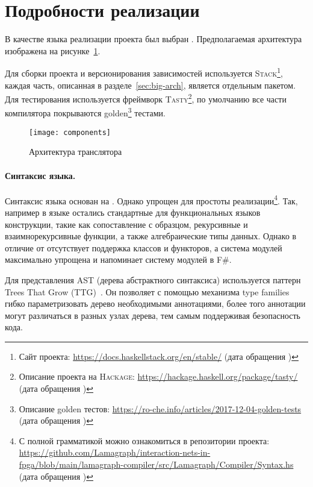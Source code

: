 
\section{Подробности реализации}

В качестве языка реализации проекта был выбран \Haskell{}.
Предполагаемая архитектура изображена на рисунке~\ref{fig:lmlcmods}.

Для сборки проекта и версионирования зависимостей используется \textsc{Stack}\footnote{Сайт проекта: \url{https://docs.haskellstack.org/en/stable/} (дата обращения )}, каждая часть, описанная в разделе~\ref{sec:big-arch}, является отдельным пакетом.
Для тестирования используется фреймворк \textsc{Tasty}\footnote{Описание проекта на \textsc{Hackage}: \url{https://hackage.haskell.org/package/tasty/} (дата обращения )}, по умолчанию все части компилятора покрываются golden\footnote{Описание golden тестов: \url{https://ro-che.info/articles/2017-12-04-golden-tests} (дата обращения )} тестами.

\begin{figure}[h]
    \begin{center}
        \texttt{[image: components]}
    \end{center}
    \caption{Архитектура транслятора}
    \label{fig:lmlcmods}
\end{figure}

\paragraph{Синтаксис языка.}

Синтаксис языка основан на \OCaml{}.
Однако упрощен для простоты реализации\footnote{С полной грамматикой можно ознакомиться в репозитории проекта: \url{https://github.com/Lamagraph/interaction-nets-in-fpga/blob/main/lamagraph-compiler/src/Lamagraph/Compiler/Syntax.hs} (дата обращения )}.
Так, например в языке остались стандартные для функциональных языков конструкции, такие как сопоставление с образцом, рекурсивные и взаимнорекурсивные функции, а также алгебраические типы данных.
Однако в отличие от \OCaml{} отсутствует поддержка классов и функторов, а система модулей максимально упрощена и напоминает систему модулей в F\#.

Для представления AST (дерева абстрактного синтаксиса) используется паттерн Trees That Grow (TTG)~\cite{shayannajdTreesThatGrow}.
Он позволяет с помощью механизма type families~\cite{schrijversTypeCheckingOpen2008} гибко параметризовать дерево необходимыми аннотациями, более того аннотации могут различаться в разных узлах дерева, тем самым поддерживая безопасность кода.


